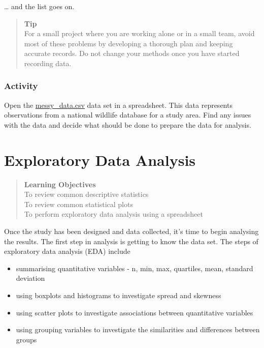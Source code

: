 \documentclass[
]{book}
\providecommand{\tightlist}{%
  \setlength{\itemsep}{0pt}\setlength{\parskip}{0pt}}
\begin{document}
\ldots{} and the list goes on.

\begin{quote}
\textbf{Tip}\\
For a small project where you are working alone or in a small team, avoid most of these problems by developing a thorough plan and keeping accurate records. Do not change your methods once you have started recording data.
\end{quote}

\subsection{Activity}\label{activity-2}

Open the \href{resources/datasets/messy_data.csv}{messy\_data.csv} data set in a spreadsheet. This data represents observations from a national wildlife database for a study area. Find any issues with the data and decide what should be done to prepare the data for analysis.

\chapter{Exploratory Data Analysis}\label{eda}

\begin{quote}
\textbf{Learning Objectives}\\
To review common descriptive statistics\\
To review common statistical plots\\
To perform exploratory data analysis using a spreadsheet
\end{quote}

Once the study has been designed and data collected, it's time to begin analysing the results. The first step in analysis is getting to know the data set. The steps of exploratory data analysis (EDA) include

\begin{itemize}
\tightlist
\item
  summarising quantitative variables - n, min, max, quartiles, mean, standard deviation
\item
  using boxplots and histograms to investigate spread and skewness
\item
  using scatter plots to investigate associations between quantitative variables
\item
  using grouping variables to investigate the similarities and differences between groups
\end{itemize}
\end{document}

